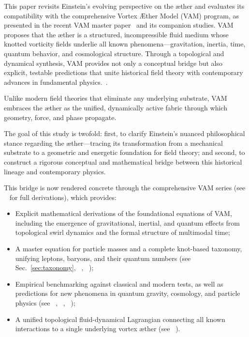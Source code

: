 \documentclass[preprint,notitlepage]{revtex4-2}
\begin{document}
This paper revisits Einstein’s evolving perspective on the æther and evaluates its compatibility with the comprehensive Vortex Æther Model (VAM) program, as presented in the recent VAM master paper~\cite{VAM-8} and its companion studies. VAM proposes that the æther is a structured, incompressible fluid medium whose knotted vorticity fields underlie all known phenomena—gravitation, inertia, time, quantum behavior, and cosmological structure. Through a topological and dynamical synthesis, VAM provides not only a conceptual bridge but also explicit, testable predictions that unite historical field theory with contemporary advances in fundamental physics.~\cite{VAM-11, VAM-15}.

Unlike modern field theories that eliminate any underlying substrate, VAM embraces the æther as the unified, dynamically active fabric through which geometry, force, and phase propagate.

The goal of this study is twofold: first, to clarify Einstein’s nuanced philosophical stance regarding the æther—tracing its transformation from a mechanical substrate to a geometric and energetic foundation for field theory; and second, to construct a rigorous conceptual and mathematical bridge between this historical lineage and contemporary physics.

This bridge is now rendered concrete through the comprehensive VAM series (see ~\cite{VAM-8} for full derivations), which provides:

\begin{itemize}
    \item Explicit mathematical derivations of the foundational equations of VAM, including the emergence of gravitational, inertial, and quantum effects from topological swirl dynamics and the formal structure of multimodal time;
    \item A master equation for particle masses and a complete knot-based taxonomy, unifying leptons, baryons, and their quantum numbers (see Sec.~\ref{sec:taxonomy}, ~\cite{VAM-8}, ~\cite{VAM-11});
    \item Empirical benchmarking against classical and modern tests, as well as predictions for new phenomena in quantum gravity, cosmology, and particle physics (see ~\cite{VAM-8}, ~\cite{VAM-12}, ~\cite{VAM-15});
    \item A unified topological fluid-dynamical Lagrangian connecting all known interactions to a single underlying vortex æther (see ~\cite{VAM-14}).
\end{itemize}
\end{document}
